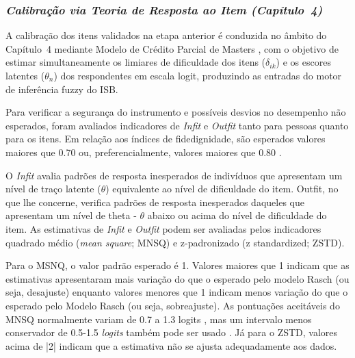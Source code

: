 

\subsubsection{\textit{Calibração via Teoria de Resposta ao Item (Capítulo~4)}}

A calibração dos itens validados na etapa anterior é conduzida no âmbito do Capítulo~4 mediante Modelo de Crédito Parcial de Masters \cite{Andrich1978ACategories}, com o objetivo de estimar simultaneamente os limiares de dificuldade dos itens ($\delta_{ik}$) e os escores latentes ($\theta_n$) dos respondentes em escala logit, produzindo as entradas do motor de inferência fuzzy do ISB.

Para verificar a segurança do instrumento e possíveis desvios no desempenho não esperados, foram avaliados indicadores de \textit{Infit} e \textit{Outfit} tanto para pessoas quanto para os itens. Em relação aos índices de fidedignidade, são esperados valores maiores que 0.70 ou, preferencialmente, valores maiores que 0.80 \cite{Linacre2012WinstepsGuide}.

O \textit{Infit} avalia padrões de resposta inesperados de indivíduos que apresentam um nível de traço latente ($\theta$) equivalente ao nível de dificuldade do item. Outfit, no que lhe concerne, verifica padrões de resposta inesperados daqueles que apresentam um nível de theta - $\theta$ abaixo ou acima do nível de dificuldade do item. As estimativas de \textit{Infit} e \textit{Outfit} podem ser avaliadas pelos indicadores quadrado médio (\textit{mean square}; MNSQ) e z-padronizado (z standardized; ZSTD). 

Para o MSNQ, o valor padrão esperado é 1. Valores maiores que 1 indicam que as estimativas apresentaram mais variação do que o esperado pelo modelo Rasch (ou seja, desajuste) enquanto valores menores que 1 indicam menos variação do que o esperado pelo Modelo Rasch (ou seja, sobreajuste). As pontuações aceitáveis do MNSQ normalmente variam de 0.7 a 1.3 logits \cite{Boone2016RaschHow,Bond2020ApplyingSciences}, mas um intervalo menos conservador de 0.5-1.5 \textit{logits} também pode ser usado \cite{Wright1994ReasonableTransactions}. Já para o ZSTD, valores acima de |2| indicam que a estimativa não se ajusta adequadamente aos dados.

